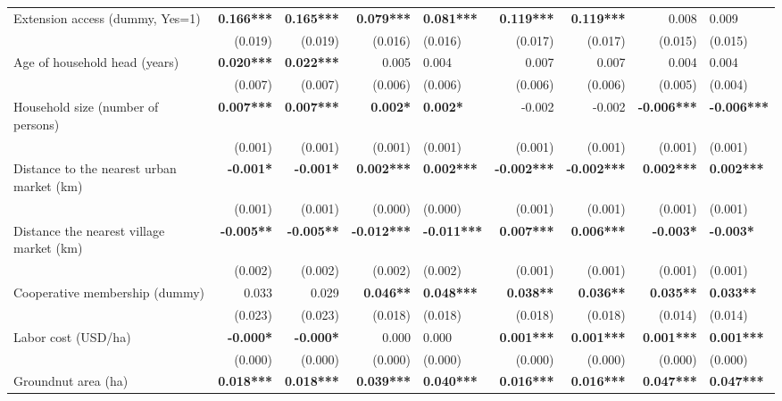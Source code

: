 \documentclass[
]{article}
\begin{document}
\begin{landscape}
\begin{longtable}[t]{lrrrlrrrl}
\endfoot
\bottomrule
\endlastfoot
Extension access (dummy, Yes=1) & \textbf{0.166***} & \textbf{0.165***} & \textbf{0.079***} & \textbf{0.081***} & \textbf{0.119***} & \textbf{0.119***} & 0.008 & 0.009\\
 & (0.019) & (0.019) & (0.016) & (0.016) & (0.017) & (0.017) & (0.015) & (0.015)\\
Age of household head (years) & \textbf{0.020***} & \textbf{0.022***} & 0.005 & 0.004 & 0.007 & 0.007 & 0.004 & 0.004\\
 & (0.007) & (0.007) & (0.006) & (0.006) & (0.006) & (0.006) & (0.005) & (0.004)\\
Household size (number of persons) & \textbf{0.007***} & \textbf{0.007***} & \textbf{0.002*} & \textbf{0.002*} & -0.002 & -0.002 & \textbf{-0.006***} & \textbf{-0.006***}\\
\addlinespace
 & (0.001) & (0.001) & (0.001) & (0.001) & (0.001) & (0.001) & (0.001) & (0.001)\\
Distance to the nearest urban market (km) & \textbf{-0.001*} & \textbf{-0.001*} & \textbf{0.002***} & \textbf{0.002***} & \textbf{-0.002***} & \textbf{-0.002***} & \textbf{0.002***} & \textbf{0.002***}\\
 & (0.001) & (0.001) & (0.000) & (0.000) & (0.001) & (0.001) & (0.001) & (0.001)\\
Distance the nearest village market (km) & \textbf{-0.005**} & \textbf{-0.005**} & \textbf{-0.012***} & \textbf{-0.011***} & \textbf{0.007***} & \textbf{0.006***} & \textbf{-0.003*} & \textbf{-0.003*}\\
 & (0.002) & (0.002) & (0.002) & (0.002) & (0.001) & (0.001) & (0.001) & (0.001)\\
\addlinespace
Cooperative membership (dummy) & 0.033 & 0.029 & \textbf{0.046**} & \textbf{0.048***} & \textbf{0.038**} & \textbf{0.036**} & \textbf{0.035**} & \textbf{0.033**}\\
 & (0.023) & (0.023) & (0.018) & (0.018) & (0.018) & (0.018) & (0.014) & (0.014)\\
Labor cost (USD/ha) & \textbf{-0.000*} & \textbf{-0.000*} & 0.000 & 0.000 & \textbf{0.001***} & \textbf{0.001***} & \textbf{0.001***} & \textbf{0.001***}\\
 & (0.000) & (0.000) & (0.000) & (0.000) & (0.000) & (0.000) & (0.000) & (0.000)\\
Groundnut area (ha) & \textbf{0.018***} & \textbf{0.018***} & \textbf{0.039***} & \textbf{0.040***} & \textbf{0.016***} & \textbf{0.016***} & \textbf{0.047***} & \textbf{0.047***}\\

\end{longtable}
\end{landscape}
\end{document}

